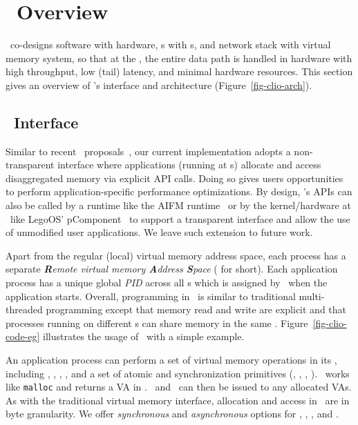 

\section{\sys\ Overview}
\label{sec:clio:hdm}

\sys\ co-designs software with hardware, \CN{}s with \MN{}s, and network stack with virtual memory system, 
so that at the \MN{}, the entire data path is handled in hardware with high throughput, low (tail) latency, and minimal hardware resources. 
This section gives an overview of \sys's interface and architecture (Figure~\ref{fig-clio-arch}).

\subsection{\sys\ Interface}
\label{sec:clio:abstraction}


Similar to recent \md\ proposals~\cite{AIFM,sebastian-hotcloud20}, our current implementation adopts a non-transparent interface where
applications (running at \CN{}s) allocate and access disaggregated memory via explicit API calls. Doing so gives users opportunities to perform application-specific performance optimizations. 
By design, \sys’s APIs can also be called by a runtime like the AIFM runtime~\cite{AIFM} or by the kernel/hardware at \CN\ like LegoOS' pComponent~\cite{Shan18-OSDI} to support a transparent interface and allow the use of unmodified user applications.
We leave such extension to future work.

Apart from the regular (local) virtual memory address space, each process has a separate {\em \textbf{R}emote virtual memory \textbf{A}ddress \textbf{S}pace} ({\em \rspace} for short).
Each application process has a unique global {\em PID} across all \CN{}s which is assigned by \sys\ when the application starts.
Overall, programming in \rspace\ is similar to traditional multi-threaded programming except that memory read and write are explicit and that processes running on different \CN{}s can share memory in the same \rspace.
Figure~\ref{fig-clio-code-eg} illustrates the usage of \sys\ with a simple example.


An application process can perform a set of virtual memory operations in its \rspace,
including \alloc, \sysfree, \Cliosysread, \Cliosyswrite, 
and a set of atomic and synchronization primitives (\eg, \syslock, \sysunlock, \fence).
\alloc\ works like \texttt{malloc} and returns a VA in \rspace. \Cliosysread\ and \Cliosyswrite\ can then be issued to any allocated VAs.
As with the traditional virtual memory interface, allocation and access in \rspace\ are in byte granularity.
We offer {\em synchronous} and {\em asynchronous} options for \alloc, \sysfree, \Cliosysread, and \Cliosyswrite.

